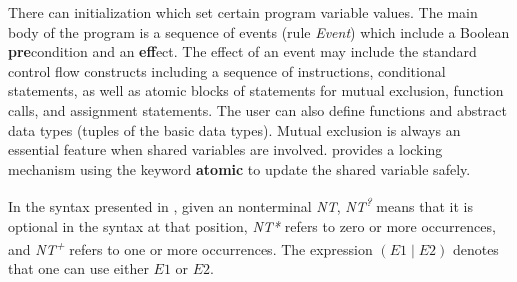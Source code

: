 There can initialization  which set certain program variable values.
The main body of the program is a sequence of  events (rule \emph{Event}) which include a Boolean \textbf{pre}condition
and an \textbf{eff}ect.
The effect of an event may include the standard control flow constructs including a sequence of instructions, conditional statements, as well as atomic blocks of statements for mutual exclusion, function calls, and assignment statements.
The user can also define functions and abstract data types (tuples of the basic data types).
Mutual exclusion is always an essential feature when shared variables are involved.
\lgname provides a locking mechanism using the keyword \textbf{atomic} to update the shared variable safely.

In the syntax presented in , given an nonterminal \textit{NT},
{\it NT\textsuperscript{?}} means that it is optional in the syntax at that position,
{\it NT*} refers to zero or more occurrences,
and {\it NT\textsuperscript{+}} refers to one or more occurrences.
The expression $(E1\mid E2)$ denotes that one can use either $E1$ or $E2$.

